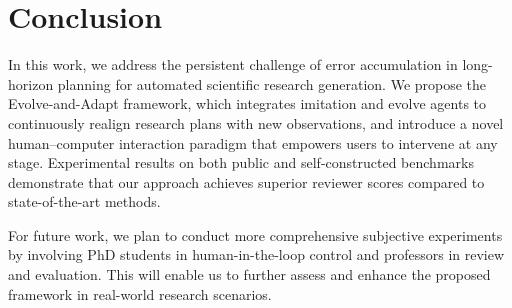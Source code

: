 \documentclass[manuscript,review,anonymous]{acmart}
\begin{document}
\section{Conclusion}

In this work, we address the persistent challenge of error accumulation in long-horizon planning for automated scientific research generation. We propose the Evolve-and-Adapt framework, which integrates imitation and evolve agents to continuously realign research plans with new observations, and introduce a novel human–computer interaction paradigm that empowers users to intervene at any stage. Experimental results on both public and self-constructed benchmarks demonstrate that our approach achieves superior reviewer scores compared to state-of-the-art methods.

For future work, we plan to conduct more comprehensive subjective experiments by involving PhD students in human-in-the-loop control and professors in review and evaluation. This will enable us to further assess and enhance the proposed framework in real-world research scenarios.



\end{document}
